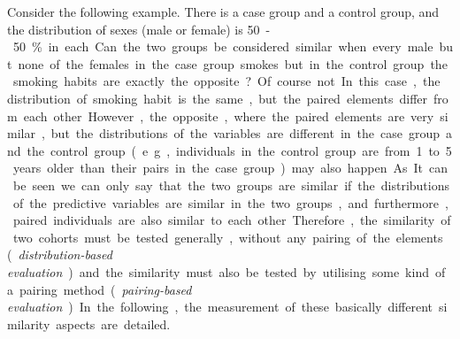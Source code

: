 
Consider the following example. There is a case group and a control group, and the distribution of sexes (male or female) is \SI{50}-\SI{50}{\percent} in each. Can the two groups be considered similar when every male but none of the females in the case group smokes but in the control group the smoking habits are exactly the opposite? Of course not. In this case, the distribution of smoking habit is the same, but the paired elements differ from each other. However, the opposite, where the paired elements are very similar, but the distributions of the variables are different in the case group and the control group (e.g.,individuals in the control group are from 1 to 5 years older than their pairs in the case group) may also happen. As It can be seen we can only say that the two groups are similar if the distributions of the predictive variables are similar in the two groups, and furthermore, paired individuals are also similar to each other.

Therefore, the similarity of two cohorts must be tested generally, without any pairing of the elements (\textit{distribution-based evaluation}) and the similarity must also be tested by utilising some kind of a pairing method (\textit{pairing-based evaluation}). In the following, the measurement of these basically different similarity aspects are detailed.


